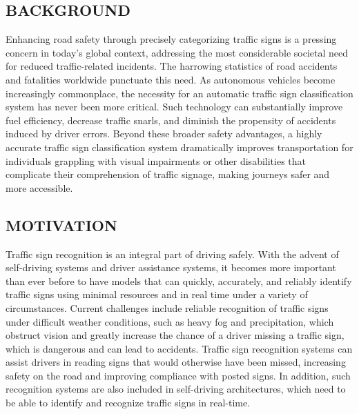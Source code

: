 \documentclass[conference]{IEEEtran}
\begin{document}
\subsection{BACKGROUND}
Enhancing road safety through precisely categorizing traffic signs is a pressing concern in today's global context, addressing the most considerable societal need for reduced traffic-related incidents. The harrowing statistics of road accidents and fatalities worldwide punctuate this need. As autonomous vehicles become increasingly commonplace, the necessity for an automatic traffic sign classification system has never been more critical. Such technology can substantially improve fuel efficiency, decrease traffic snarls, and diminish the propensity of accidents induced by driver errors. Beyond these broader safety advantages, a highly accurate traffic sign classification system dramatically improves transportation for individuals grappling with visual impairments or other disabilities that complicate their comprehension of traffic signage, making journeys safer and more accessible.

\subsection{MOTIVATION}
Traffic sign recognition is an integral part of driving safely. With the advent of self-driving systems and driver assistance systems, it becomes more important than ever before to have models that can quickly, accurately, and reliably identify traffic signs using minimal resources and in real time under a variety of circumstances. Current challenges include reliable recognition of traffic signs under difficult weather conditions, such as heavy fog and precipitation, which obstruct vision and greatly increase the chance of a driver missing a traffic sign, which is dangerous and can lead to accidents. Traffic sign recognition systems can assist drivers in reading signs that would otherwise have been missed, increasing safety on the road and improving compliance with posted signs. In addition, such recognition systems are also included in self-driving architectures, which need to be able to identify and recognize traffic signs in real-time.
\end{document}
